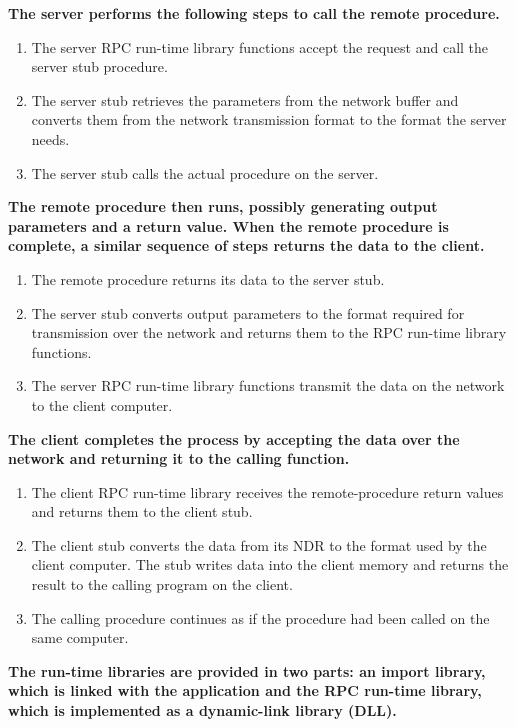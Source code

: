 \documentclass{article}
\begin{document}
\begin{CJK*}{UTF8}{gkai}
{\sffamily \scriptsize \bfseries 
The server performs the following steps to call the remote procedure.
}

{\sffamily \scriptsize
\begin{enumerate}
\item{The server RPC run-time library functions accept the request and call the server stub procedure.}
\item{The server stub retrieves the parameters from the network buffer and converts them from the network transmission format to the format the server needs.}
\item{The server stub calls the actual procedure on the server.}
\end{enumerate}
}

{\sffamily \scriptsize \bfseries 
The remote procedure then runs, possibly generating output parameters and a return value. When the remote procedure is complete, a similar sequence of steps returns the data to the client.
}

{\sffamily \scriptsize
\begin{enumerate}
\item{The remote procedure returns its data to the server stub.}
\item{The server stub converts output parameters to the format required for transmission over the network and returns them to the RPC run-time library functions.}
\item{The server RPC run-time library functions transmit the data on the network to the client computer.}
\end{enumerate}
}

{\sffamily \scriptsize \bfseries 
The client completes the process by accepting the data over the network and returning it to the calling function.
}

{\sffamily \scriptsize  
\begin{enumerate}
\item{The client RPC run-time library receives the remote-procedure return values and returns them to the client stub.}
\item{The client stub converts the data from its NDR to the format used by the client computer. The stub writes data into the client memory and returns the result to the calling program on the client.}
\item{The calling procedure continues as if the procedure had been called on the same computer.}
\end{enumerate}
}

{\sffamily \scriptsize \bfseries 
The run-time libraries are provided in two parts: an import library, which is linked with the application and the RPC run-time library, which is implemented as a dynamic-link library (DLL).

}
\end{CJK*}
\end{document}
